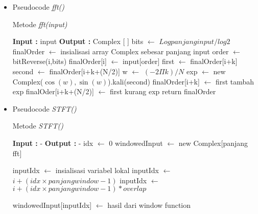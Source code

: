 \begin{itemize}
\item Pseudocode {\it fft()}
\begin{algorithm}[htbp]
	\label{alg:fft}
		\caption{Metode {\it fft(input)}}
		\begin{algorithmic}[1]
		\State \textbf{Input  :} input
		\State \textbf{Output :} Complex [ ]
			\State bits $\leftarrow$ $Log panjang input / log2$
			\State finalOrder $\leftarrow$ insialisasi array Complex sebesar panjang input
				\State order $\leftarrow$ bitReverse(i,bits)
				\State finalOrder[i] $\leftarrow$ input[order]
			\EndFor
						\State first $\leftarrow$ finalOrder[i+k]
						\State second $\leftarrow$ finalOrder[i+k+(N/2)]
						\State w $\leftarrow$ $(-2 \Pi k) / N$
						\State exp $\leftarrow$ new Complex($\cos(w), \sin(w)$).kali(second)
						\State finalOrder[i+k] $\leftarrow$ first tambah exp
						\State finalOder[i+k+(N/2)] $\leftarrow$ first kurang exp
					\EndFor				
				\EndFor		
			\EndFor
			\State return finalOrder
		\EndFunction
	\end{algorithmic}
	\end{algorithm}
	
\item Pseudocode {\it STFT()}
\begin{algorithm}[htbp]
	\label{alg:STFT}
		\caption{Metode {\it STFT()}}
		\begin{algorithmic}[1]
		\State \textbf{Input  :} -
		\State \textbf{Output :} -
			\State idx $\leftarrow$ 0
				\State windowedInput $\leftarrow$ new Complex[panjang fft]
\end{algorithmic}
\end{algorithm}

\begin{algorithm}[H]
\begin{algorithmic}
					\State inputIdx $\leftarrow$ insialisasi variabel lokal
						\State inputIdx $\leftarrow$ $i+(idx \times panjang window -1)$
					\Else
						\State inputIdx $\leftarrow$ $i+(idx \times panjang window -1)*overlap$
					\EndIf
					
					\State windowedInput[inputIdx] $\leftarrow$ hasil dari window function
				\EndFor


\end{algorithmic}
\end{algorithm}
\end{itemize}

